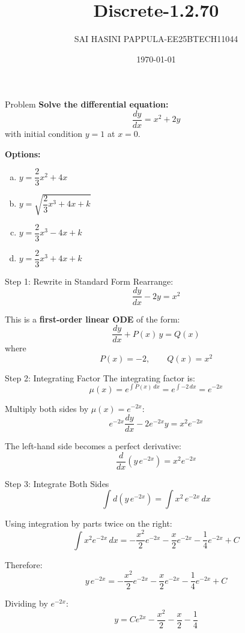 \documentclass{beamer}
\title{Discrete-1.2.70}
\author{SAI HASINI PAPPULA-EE25BTECH11044}
\date{\today}
\begin{document}
\begin{frame}
\titlepage
\end{frame}

\begin{frame}{Problem}
\textbf{Solve the differential equation:}
\[
\frac{dy}{dx} = x^2 + 2y
\]
with initial condition $y = 1$ at $x = 0$.

\vspace{1em}
\textbf{Options:}
\begin{enumerate}[(a)]
    \item $y = \dfrac{2}{3}x^2 + 4x$
    \item $y = \sqrt{\dfrac{2}{3}x^3 + 4x + k}$
    \item $y = \dfrac{2}{3}x^3 - 4x + k$
    \item $y = \dfrac{2}{3}x^3 + 4x + k$
\end{enumerate}
\end{frame}

\begin{frame}{Step 1: Rewrite in Standard Form}
Rearrange:
\[
\frac{dy}{dx} - 2y = x^2
\]

This is a \textbf{first-order linear ODE} of the form:
\[
\frac{dy}{dx} + P(x)\,y = Q(x)
\]
where
\[
P(x) = -2, \qquad Q(x) = x^2
\]
\end{frame}

\begin{frame}{Step 2: Integrating Factor}
The integrating factor is:
\[
\mu(x) = e^{\int P(x)\,dx} = e^{\int -2\,dx} = e^{-2x}
\]

Multiply both sides by $\mu(x) = e^{-2x}$:
\[
e^{-2x}\frac{dy}{dx} - 2e^{-2x}y = x^2 e^{-2x}
\]

The left-hand side becomes a perfect derivative:
\[
\frac{d}{dx}\!\left(y\,e^{-2x}\right) = x^2 e^{-2x}
\]
\end{frame}

\begin{frame}{Step 3: Integrate Both Sides}
\[
\int d\!\left(y\,e^{-2x}\right) = \int x^2\,e^{-2x}\,dx
\]

Using integration by parts twice on the right:
\[
\int x^2 e^{-2x}\,dx = -\frac{x^2}{2}e^{-2x} - \frac{x}{2}e^{-2x} - \frac{1}{4}e^{-2x} + C
\]

Therefore:
\[
y\,e^{-2x} = -\frac{x^2}{2}e^{-2x} - \frac{x}{2}e^{-2x} - \frac{1}{4}e^{-2x} + C
\]

Dividing by $e^{-2x}$:
\[
y = Ce^{2x} - \frac{x^2}{2} - \frac{x}{2} - \frac{1}{4}
\]
\end{frame}
\end{document}
